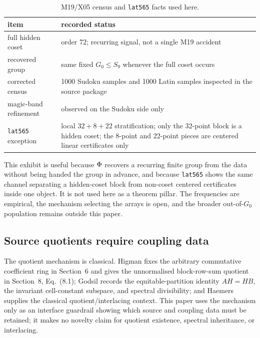 \begin{table}[!htbp]
\centering
\caption{M19/X05 census and \texttt{lat565} facts used here.}
\label{tab:m19-census}
\begin{tabular}{@{}lL{0.62\textwidth}@{}}
\toprule
item & recorded status \\
\midrule
full hidden coset & order 72; recurring signal, not a single M19 accident \\
recovered group & same fixed \(G_0\leq S_9\) whenever the full coset occurs \\
corrected census & 1000 Sudoku samples and 1000 Latin samples inspected in the source package \\
magic-band refinement & observed on the Sudoku side only \\
\texttt{lat565} exception & local \(32+8+22\) stratification; only the 32-point block is a hidden coset; the 8-point and 22-point pieces are centered linear certificates only \\
\bottomrule
\end{tabular}
\end{table}

This exhibit is useful because \(\Phi\) recovers a recurring finite group from the data without being handed the group in advance, and because \texttt{lat565} shows the same channel separating a hidden-coset block from non-coset centered certificates inside one object.  It is not used here as a theorem pillar.  The frequencies are empirical, the mechanism selecting the arrays is open, and the broader out-of-\(G_0\) population remains outside this paper.

\subsection{Source quotients require coupling data}
\label{subsec:source-coupling}

The quotient mechanism is classical.  Higman fixes the arbitrary commutative coefficient ring in Section~6 and gives the unnormalised block-row-sum quotient in Section~8, Eq.~(8.1)\cite[\S6, p.~11; \S8, Eq.~(8.1), p.~20]{Higman1970CoherentConfigurations}; Godsil records the equitable-partition identity \(AH=HB\), the invariant cell-constant subspace, and spectral divisibility\cite[\S5.1, Eq.~(5.1.1) and Lem.~5.1.2]{GodsilAssociationSchemes2010}; and Haemers supplies the classical quotient/interlacing context\cite[\S2]{Haemers1995Interlacing}.  This paper uses the mechanism only as an interface guardrail showing which source and coupling data must be retained; it makes no novelty claim for quotient existence, spectral inheritance, or interlacing.

